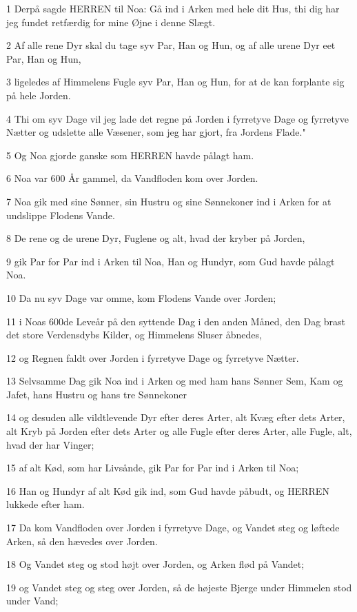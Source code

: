 \par 1 Derpå sagde HERREN til Noa: Gå ind i Arken med hele dit Hus, thi dig har jeg fundet retfærdig for mine Øjne i denne Slægt.
\par 2 Af alle rene Dyr skal du tage syv Par, Han og Hun, og af alle urene Dyr eet Par, Han og Hun,
\par 3 ligeledes af Himmelens Fugle syv Par, Han og Hun, for at de kan forplante sig på hele Jorden.
\par 4 Thi om syv Dage vil jeg lade det regne på Jorden i fyrretyve Dage og fyrretyve Nætter og udslette alle Væsener, som jeg har gjort, fra Jordens Flade."
\par 5 Og Noa gjorde ganske som HERREN havde pålagt ham.
\par 6 Noa var 600 År gammel, da Vandfloden kom over Jorden.
\par 7 Noa gik med sine Sønner, sin Hustru og sine Sønnekoner ind i Arken for at undslippe Flodens Vande.
\par 8 De rene og de urene Dyr, Fuglene og alt, hvad der kryber på Jorden,
\par 9 gik Par for Par ind i Arken til Noa, Han og Hundyr, som Gud havde pålagt Noa.
\par 10 Da nu syv Dage var omme, kom Flodens Vande over Jorden;
\par 11 i Noas 600de Leveår på den syttende Dag i den anden Måned, den Dag brast det store Verdensdybs Kilder, og Himmelens Sluser åbnedes,
\par 12 og Regnen faldt over Jorden i fyrretyve Dage og fyrretyve Nætter.
\par 13 Selvsamme Dag gik Noa ind i Arken og med ham hans Sønner Sem, Kam og Jafet, hans Hustru og hans tre Sønnekoner
\par 14 og desuden alle vildtlevende Dyr efter deres Arter, alt Kvæg efter dets Arter, alt Kryb på Jorden efter dets Arter og alle Fugle efter deres Arter, alle Fugle, alt, hvad der har Vinger;
\par 15 af alt Kød, som har Livsånde, gik Par for Par ind i Arken til Noa;
\par 16 Han og Hundyr af alt Kød gik ind, som Gud havde påbudt, og HERREN lukkede efter ham.
\par 17 Da kom Vandfloden over Jorden i fyrretyve Dage, og Vandet steg og løftede Arken, så den hævedes over Jorden.
\par 18 Og Vandet steg og stod højt over Jorden, og Arken flød på Vandet;
\par 19 og Vandet steg og steg over Jorden, så de højeste Bjerge under Himmelen stod under Vand;
